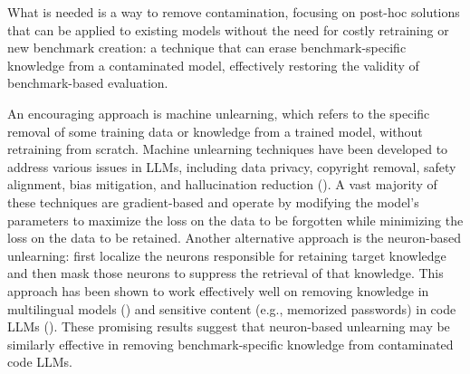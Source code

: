 \documentclass[mscthesis]{usiinfthesis}
\begin{document}
What is needed is a way to remove contamination, focusing on post-hoc solutions that can be applied to existing models without the need for costly retraining or new benchmark creation: a technique that can erase benchmark-specific knowledge from a contaminated model, effectively restoring the validity of benchmark-based evaluation.
\par\vspace{1em}
An encouraging approach is machine unlearning, which refers to the specific removal of some training data or knowledge from a trained model, without retraining from scratch.
Machine unlearning techniques have been developed to address various issues in LLMs, including data privacy, copyright removal, safety alignment, bias mitigation, and hallucination reduction (\citet{liu2024rethinkingmachineunlearninglarge}).
A vast majority of these techniques are gradient-based and operate by modifying the model's parameters to maximize the loss on the data to be forgotten while minimizing the loss on the data to be retained.
Another alternative approach is the neuron-based unlearning: first localize the neurons responsible for retaining target knowledge and then mask those neurons to suppress the retrieval of that knowledge.
This approach has been shown to work effectively well on removing knowledge in multilingual models (\citet{kojima2024multilingualabilitydecoderbasedpretrained}) and sensitive content (e.g., memorized passwords) in code LLMs (\citet{pochinkov2024dissectinglanguagemodelsmachine}).
These promising results suggest that neuron-based unlearning may be similarly effective in removing benchmark-specific knowledge from contaminated code LLMs.
\end{document}
